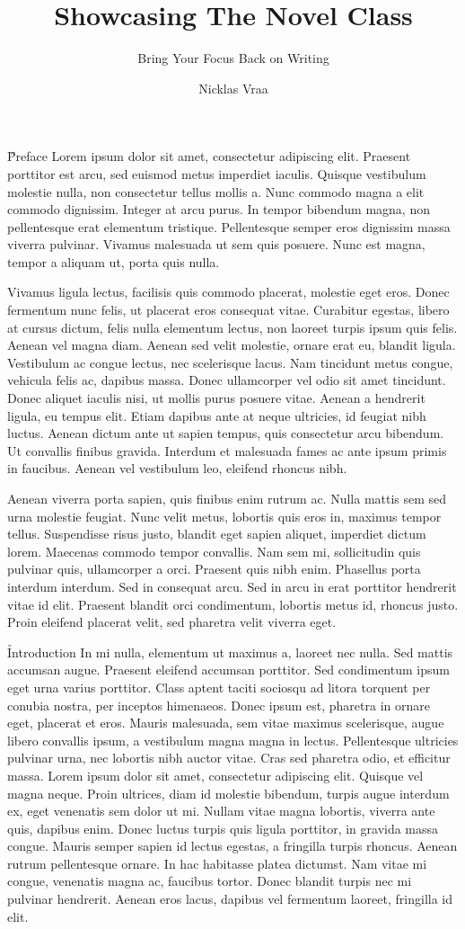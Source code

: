 \documentclass{novel}
\title{Showcasing The Novel Class}
\subtitle{Bring Your Focus Back on Writing}
\author{Nicklas Vraa}
\begin{document}
\metadata

\H{Preface}
Lorem ipsum dolor sit amet, consectetur adipiscing elit. Praesent porttitor est arcu, sed euismod metus imperdiet iaculis. Quisque vestibulum molestie nulla, non consectetur tellus mollis a. Nunc commodo magna a elit commodo dignissim. Integer at arcu purus. In tempor bibendum magna, non pellentesque erat elementum tristique. Pellentesque semper eros dignissim massa viverra pulvinar. Vivamus malesuada ut sem quis posuere. Nunc est magna, tempor a aliquam ut, porta quis nulla.

Vivamus ligula lectus, facilisis quis commodo placerat, molestie eget eros. Donec fermentum nunc felis, ut placerat eros consequat vitae. Curabitur egestas, libero at cursus dictum, felis nulla elementum lectus, non laoreet turpis ipsum quis felis. Aenean vel magna diam. Aenean sed velit molestie, ornare erat eu, blandit ligula. Vestibulum ac congue lectus, nec scelerisque lacus. Nam tincidunt metus congue, vehicula felis ac, dapibus massa. Donec ullamcorper vel odio sit amet tincidunt. Donec aliquet iaculis nisi, ut mollis purus posuere vitae. Aenean a hendrerit ligula, eu tempus elit. Etiam dapibus ante at neque ultricies, id feugiat nibh luctus. Aenean dictum ante ut sapien tempus, quis consectetur arcu bibendum. Ut convallis finibus gravida. Interdum et malesuada fames ac ante ipsum primis in faucibus. Aenean vel vestibulum leo, eleifend rhoncus nibh.

Aenean viverra porta sapien, quis finibus enim rutrum ac. Nulla mattis sem sed urna molestie feugiat. Nunc velit metus, lobortis quis eros in, maximus tempor tellus. Suspendisse risus justo, blandit eget sapien aliquet, imperdiet dictum lorem. Maecenas commodo tempor convallis. Nam sem mi, sollicitudin quis pulvinar quis, ullamcorper a orci. Praesent quis nibh enim. Phasellus porta interdum interdum. Sed in consequat arcu. Sed in arcu in erat porttitor hendrerit vitae id elit. Praesent blandit orci condimentum, lobortis metus id, rhoncus justo. Proin eleifend placerat velit, sed pharetra velit viverra eget.

\h{Introduction}
In mi nulla, elementum ut maximus a, laoreet nec nulla. Sed mattis accumsan augue. Praesent eleifend accumsan porttitor. Sed condimentum ipsum eget urna varius porttitor. Class aptent taciti sociosqu ad litora torquent per conubia nostra, per inceptos himenaeos. Donec ipsum est, pharetra in ornare eget, placerat et eros. Mauris malesuada, sem vitae maximus scelerisque, augue libero convallis ipsum, a vestibulum magna magna in lectus. Pellentesque ultricies pulvinar urna, nec lobortis nibh auctor vitae. Cras sed pharetra odio, et efficitur massa. Lorem ipsum dolor sit amet, consectetur adipiscing elit. Quisque vel magna neque. Proin ultrices, diam id molestie bibendum, turpis augue interdum ex, eget venenatis sem dolor ut mi. Nullam vitae magna lobortis, viverra ante quis, dapibus enim. Donec luctus turpis quis ligula porttitor, in gravida massa congue. Mauris semper sapien id lectus egestas, a fringilla turpis rhoncus. Aenean rutrum pellentesque ornare. In hac habitasse platea dictumst. Nam vitae mi congue, venenatis magna ac, faucibus tortor. Donec blandit turpis nec mi pulvinar hendrerit. Aenean eros lacus, dapibus vel fermentum laoreet, fringilla id elit.
\end{document}
